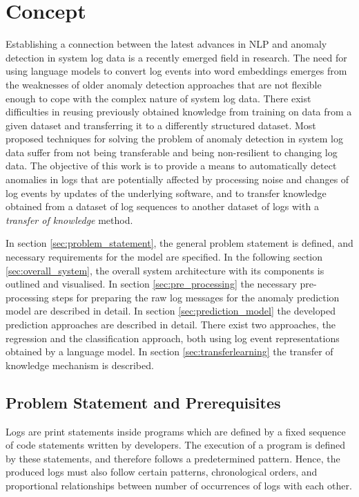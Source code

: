 \chapter{Concept \label{cha:concept}}
Establishing a connection between the latest advances in NLP and anomaly detection in system log data is a recently emerged field in research. The need for using language models to convert log events into word embeddings emerges from the weaknesses of older anomaly detection approaches that are not flexible enough to cope with the complex nature of system log data. There exist difficulties in reusing previously obtained knowledge from training on data from a given dataset and transferring it to a differently structured dataset. Most proposed techniques for solving the problem of anomaly detection in system log data suffer from not being transferable and being non-resilient to changing log data. The objective of this work is to provide a means to automatically detect anomalies in logs that are potentially affected by processing noise and changes of log events by updates of the underlying software, and to transfer knowledge obtained from a dataset of log sequences to another dataset of logs with a \textit{transfer of knowledge} method.

In section \ref{sec:problem_statement}, the general problem statement is defined, and necessary requirements for the model are specified. 
In the following section \ref{sec:overall_system}, the overall system architecture with its components is outlined and visualised.
In section \ref{sec:pre_processing} the necessary pre-processing steps for preparing the raw log messages for the anomaly prediction model are described in detail.
In section \ref{sec:prediction_model} the developed prediction approaches are described in detail. There exist two approaches, the regression and the classification approach, both using log event representations obtained by a language model.
In section \ref{sec:transferlearning} the transfer of knowledge mechanism is described.


\section{Problem Statement and Prerequisites \label{sec:problem_statement}}
Logs are print statements inside programs which are defined by a fixed sequence of code statements written by developers. The execution of a program is defined by these statements, and therefore follows a predetermined pattern. Hence, the produced logs must also follow certain patterns, chronological orders, and proportional relationships between number of occurrences of logs with each other.

